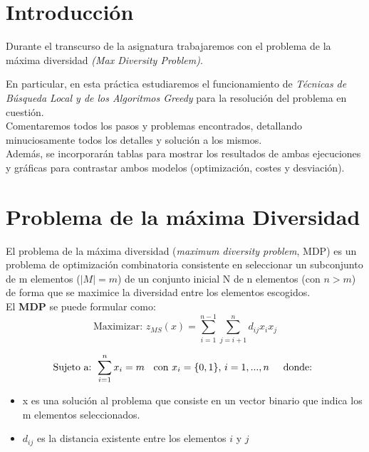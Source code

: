 

\newpage


\section{Introducción}
\hspace{1.5cm} Durante el transcurso de la asignatura trabajaremos con el problema de la máxima diversidad \textit{(Max Diversity Problem)}. 


En particular, en esta práctica estudiaremos el funcionamiento de \textit{Técnicas de Búsqueda Local y de los Algoritmos Greedy} para la resolución del problema en cuestión. \\
Comentaremos todos los pasos y problemas encontrados, detallando minuciosamente todos los detalles y solución a los mismos. \\

Además, se incorporarán tablas para mostrar los resultados de ambas ejecuciones y  gráficas para contrastar ambos modelos (optimización, costes y desviación).


\section{Problema de la máxima Diversidad}
\hspace{1.5cm} El problema de la máxima diversidad (\textit{maximum diversity problem}, MDP) es un problema de optimización combinatoria consistente en seleccionar un subconjunto de m elementos ($|M|=m$) de un conjunto inicial N de n elementos (con $n>m$) de forma que se maximice la diversidad entre los elementos escogidos. \\


El \textbf{MDP} se puede formular como: \\


\[
\text{Maximizar:   }  z_{MS}(x) = \sum_{i=1}^{n-1} \sum_{j=i+1}^{n} d_{ij}x_i x_j
\]



\[
\text{Sujeto a: } \sum_{i=1}^{n} x_i=m \hspace{0.2cm} \text{ con } x_i=\{0,1\} \text{, } i=1,...,n  \hspace{0.5cm} \text{donde: }
\]


\begin{itemize}
	\item x es una solución al problema que consiste en un vector binario que indica los m elementos seleccionados.
	\item $d_{ij}$ es la distancia existente entre los elementos $i$ y $j$
	
\end{itemize}


